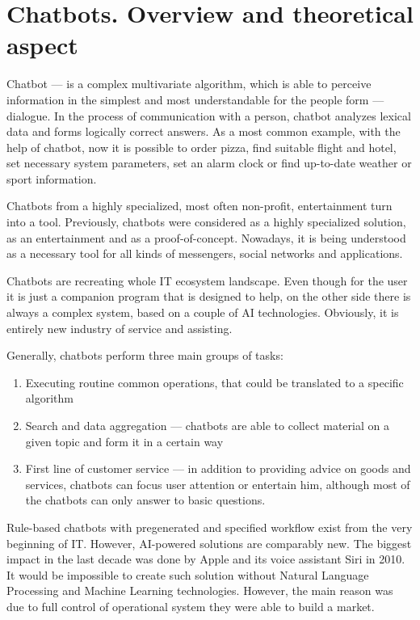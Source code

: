 
\section{Chatbots. Overview and theoretical aspect}

Chatbot — is a complex multivariate algorithm, which is able to perceive information in the simplest and most understandable for the people form — dialogue.
In the process of communication with a person, chatbot analyzes lexical data and forms logically correct answers.
As a most common example, with the help of chatbot, now it is possible to order pizza, find suitable flight and hotel, set necessary system parameters, set an alarm clock or find up-to-date weather or sport information.

Chatbots from a highly specialized, most often non-profit, entertainment turn into a tool.
Previously, chatbots were considered as a highly specialized solution, as an entertainment and as a proof-of-concept.
Nowadays, it is being understood as a necessary tool for all kinds of messengers, social networks and applications.

Chatbots are recreating whole IT ecosystem landscape.
Even though for the user it is just a companion program that is designed to help, on the other side there is always a complex system, based on a couple of AI technologies.
Obviously, it is entirely new industry of service and assisting.

Generally, chatbots perform three main groups of tasks:
\begin{enumerate}
    \item Executing routine common operations, that could be translated to a specific algorithm
    \item Search and data aggregation — chatbots are able to collect material on a given topic and form it in a certain way
    \item First line of customer service — in addition to providing advice on goods and services, chatbots can focus user attention or entertain him, although most of the chatbots can only answer to basic questions.
\end{enumerate}

Rule-based chatbots with pregenerated and specified workflow exist from the very beginning of IT.
However, AI-powered solutions are comparably new.
The biggest impact in the last decade was done by Apple and its voice assistant Siri in 2010.
It would be impossible to create such solution without Natural Language Processing and Machine Learning technologies.
However, the main reason was due to full control of operational system they were able to build a market.

